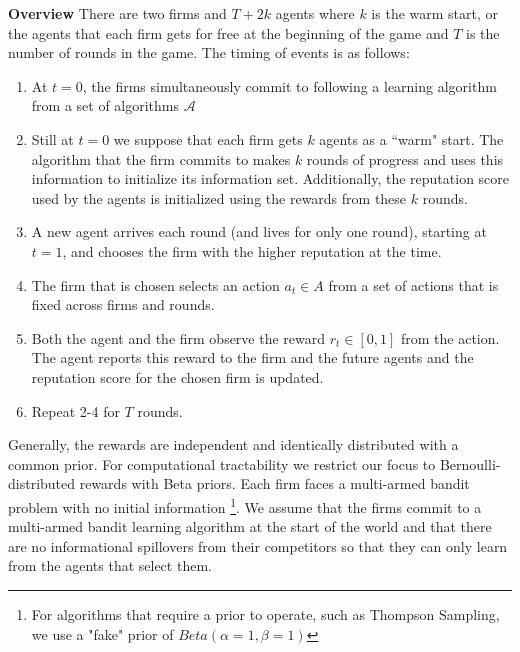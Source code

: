 \documentclass[letterpaper]{article}
\theoremstyle{definition}
\begin{document}
\textbf{Overview} There are two firms and $T+2k$ agents where $k$ is the warm start, or the agents that each firm gets for free at the beginning of the game and $T$ is the number of rounds in the game. The timing of events is as follows:
\begin{enumerate}
\item At $t = 0$, the firms simultaneously commit to following a learning algorithm from a set of algorithms $\mathcal{A}$
\item Still at $t = 0$ we suppose that each firm gets $k$ agents as a ``warm" start. The algorithm that the firm commits to makes $k$ rounds of progress and uses this information to initialize its information set. Additionally, the reputation score used by the agents is initialized using the rewards from these $k$ rounds.
\item A new agent arrives each round (and lives for only one round), starting at $t = 1$, and chooses the firm with the higher reputation at the time.
\item The firm that is chosen selects an action $a_{t} \in A$ from a set of actions that is fixed across firms and rounds.
\item Both the agent and the firm observe the reward $r_t \in [0, 1]$ from the action. The agent reports this reward to the firm and the future agents and the reputation score for the chosen firm is updated.
\item Repeat 2-4 for $T$ rounds.
\end{enumerate}

Generally, the rewards are independent and identically distributed with a common prior.  For computational tractability we restrict our focus to Bernoulli-distributed rewards with Beta priors. Each firm faces a multi-armed bandit problem with no initial information \footnote{For algorithms that require a prior to operate, such as Thompson Sampling, we use a "fake" prior of $Beta(\alpha=1,\beta=1)$}. We assume that the firms commit to a multi-armed bandit learning algorithm at the start of the world and that there are no informational spillovers from their competitors so that they can only learn from the agents that select them.
\end{document}
